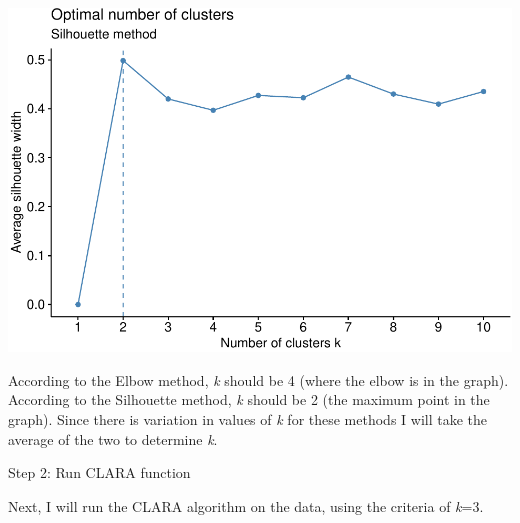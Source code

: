 \documentclass[12pt,twoside]{amherstthesis}
\begin{document}
  \begin{Shaded}
  \begin{Highlighting}[]
   \NormalTok{) }\OperatorTok{+}
  \StringTok{  }\NormalTok{(} \NormalTok{)}
  \end{Highlighting}
  \end{Shaded}
  
  \begin{center}\includegraphics{Comps_Proj_files/figure-latex/unnamed-chunk-5-2} \end{center}
  
  According to the Elbow method, \emph{k} should be 4 (where the elbow is
  in the graph). According to the Silhouette method, \emph{k} should be 2
  (the maximum point in the graph). Since there is variation in values of
  \emph{k} for these methods I will take the average of the two to
  determine \emph{k}.
  
  Step 2: Run CLARA function
  
  Next, I will run the CLARA algorithm on the data, using the criteria of
  \emph{k}=3.
  
  \begin{Shaded}
  \begin{Highlighting}[]
  \StringTok{ }\NormalTok{(new[}\OperatorTok{:}\NormalTok{], }\NormalTok{)}
  \end{Highlighting}
  \end{Shaded}
  
\end{document}
